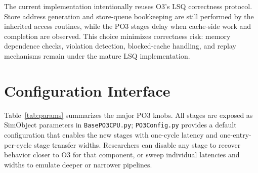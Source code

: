 \documentclass[10pt,twocolumn]{article}
\newcommand{\po}{\textsc{PO3}}
\newcommand{\oo}{\textsc{O3}}
\begin{document}
The current implementation intentionally reuses \oo{}'s LSQ correctness protocol.  Store address generation and store-queue bookkeeping are still performed by the inherited access routines, while the \po{} stages delay when cache-side work and completion are observed.  This choice minimizes correctness risk: memory dependence checks, violation detection, blocked-cache handling, and replay mechanisms remain under the mature LSQ implementation.

\section{Configuration Interface}
Table~\ref{tab:params} summarizes the major \po{} knobs.  All stages are exposed as SimObject parameters in \texttt{BasePO3CPU.py}; \texttt{PO3Config.py} provides a default configuration that enables the new stages with one-cycle latency and one-entry-per-cycle stage transfer widths.  Researchers can disable any stage to recover behavior closer to \oo{} for that component, or sweep individual latencies and widths to emulate deeper or narrower pipelines.
\end{document}
